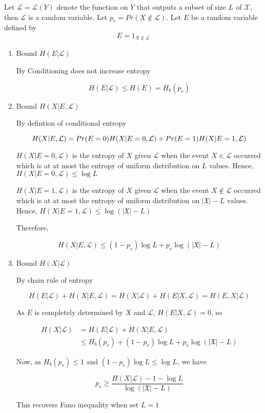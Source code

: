 \documentclass{article}
\begin{document}
\begin{longproof}
Let $\mathcal{L} = \mathcal{L}(Y)$ denote the function on $Y$ that outputs a subset of size $L$ of $\mathcal{X}$, then $\mathcal{L}$ is a random variable. Let $p_e = Pr(X \notin \mathcal{L})$. Let $E$ be a random variable defined by
$$
    E = 1_{X \notin \mathcal{L}}
$$

\begin{enumerate}
\item Bound $H(E|\mathcal{L})$

By Conditioning does not increase entropy

$$
    H(E|\mathcal{L}) \leq H(E) = H_b(p_e)
$$

\item Bound $H(X|E, \mathcal{L})$

By defintion of conditional entropy

$$
    H(X|E, \mathcal{L}) = Pr(E=0) H(X|E=0, \mathcal{L}) + Pr(E=1) H(X|E=1, \mathcal{L}) \\
$$

$H(X|E=0, \mathcal{L})$ is the entropy of $X$ given $\mathcal{L}$ when the event $X \in \mathcal{L}$ occurred which is at at most the entropy of uniform distribution on $L$ values. Hence, $H(X|E=0, \mathcal{L}) \leq \log L$

$H(X|E=1, \mathcal{L})$ is the entropy of $X$ given $\mathcal{L}$ when the event $X \notin \mathcal{L}$ occurred which is at at most the entropy of uniform distribution on $|\mathfrak{X}| - L$ values. Hence, $H(X|E=1, \mathcal{L}) \leq \log (|\mathfrak{X}| - L)$

Therefore,

$$
    H(X|E, \mathcal{L}) \leq (1-p_e) \log L + p_e \log (|\mathfrak{X}| - L)
$$

\item Bound $ H(X|\mathcal{L})$

By chain rule of entropy

$$
    H(E|\mathcal{L}) + H(X|E, \mathcal{L}) = H(X|\mathcal{L}) + H(E|X, \mathcal{L}) = H(E, X|\mathcal{L})
$$

As $E$ is completely determined by $X$ and $\mathcal{L}$, $H(E|X, \mathcal{L}) = 0$, so

\begin{align*}
    H(X|\mathcal{L})
    &= H(E|\mathcal{L}) + H(X|E, \mathcal{L}) \\
    &\leq H_b(p_e) + (1-p_e) \log L + p_e \log (|\mathfrak{X}| - L)
\end{align*}

Now, as $H_b(p_e) \leq 1$ and $(1-p_e) \log L \leq \log L$, we have

$$
    p_e \geq \frac{H(X|\mathcal{L}) - 1 - \log L}{\log (|\mathfrak{X}| - L)}
$$

This recovers Fano inequality when set $L=1$



\end{enumerate}





    
\end{longproof}
\end{document}
